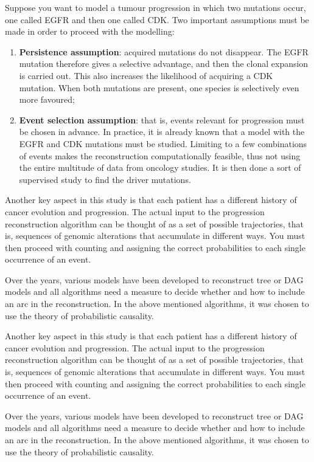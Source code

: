 Suppose you want to model a tumour progression in which two mutations occur, one called EGFR and
then one called CDK. Two important assumptions must be made in order to proceed with the modelling:
\begin{enumerate}
    \item \textbf{Persistence assumption}: acquired mutations do not disappear. The EGFR mutation
          therefore gives a selective advantage, and then the clonal expansion is carried out. This
          also increases the likelihood of acquiring a CDK mutation. When both mutations are present,
          one species is selectively even more favoured;
    \item \textbf{Event selection assumption}: that is, events relevant for progression must be chosen
          in advance. In practice, it is already known that a model with the EGFR and CDK mutations must
          be studied. Limiting to a few combinations of events makes the reconstruction computationally
          feasible, thus not using the entire multitude of data from oncology studies. It is then done a
          sort of supervised study to find the driver mutations.
\end{enumerate}

Another key aspect in this study is that each patient has a different history of cancer evolution
and progression. The actual input to the progression reconstruction algorithm can be thought of as
a set of possible trajectories, that is, sequences of genomic alterations that accumulate in
different ways. You must then proceed with counting and assigning the correct probabilities to each
single occurrence of an event.

Over the years, various models have been developed to reconstruct tree or DAG models and all algorithms
need a measure to decide whether and how to include an arc in the reconstruction. In the above
mentioned algorithms, it was chosen to use the theory of probabilistic causality.

Another key aspect in this study is that each patient has a different history of cancer evolution and
progression. The actual input to the progression reconstruction algorithm can be thought of as a set of
possible trajectories, that is, sequences of genomic alterations that accumulate in different ways. You
must then proceed with counting and assigning the correct probabilities to each single occurrence of an
event.

Over the years, various models have been developed to reconstruct tree or DAG models and all algorithms
need a measure to decide whether and how to include an arc in the reconstruction. In the above mentioned
algorithms, it was chosen to use the theory of probabilistic causality.

